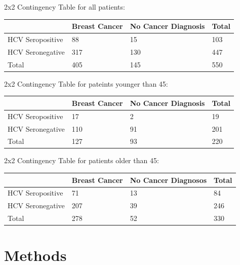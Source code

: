 \documentclass[12pt, titlepage]{article}
\begin{document}
\begin{minipage}{\textwidth}
2x2 Contingency Table for all patients:

\begin{tabular}{ | m{4cm} | m{4cm}| m{4cm} | m{2cm} | }
  \hline
    & Breast Cancer & No Cancer Diagnosis & Total\\ 
  \hline
  HCV Seropositive & 88 & 15 & 103 \\ 
  \hline
  HCV Seronegative & 317 & 130 & 447 \\ 
  \hline
  Total & 405 & 145 & 550 \\ 
  \hline
\end{tabular}

\vspace{1cm}

2x2 Contingency Table for pateints younger than 45:

\begin{tabular}{ | m{4cm} | m{4cm}| m{4cm} | m{2cm} | }
  \hline
    & Breast Cancer & No Cancer Diagnosis & Total\\ 
  \hline
  HCV Seropositive & 17 & 2 & 19 \\ 
  \hline
  HCV Seronegative & 110 & 91 & 201 \\ 
  \hline
  Total & 127 & 93 & 220 \\ 
  \hline
\end{tabular}

\vspace{1cm}

2x2 Contingency Table for patients older than 45:

\begin{tabular}{ | m{4cm} | m{4cm}| m{4cm} | m{2cm} | }
  \hline
    & Breast Cancer & No Cancer Diagnosos & Total\\ 
  \hline
  HCV Seropositive & 71 & 13 & 84 \\ 
  \hline
  HCV Seronegative & 207 & 39 & 246 \\ 
  \hline
  Total & 278 & 52 & 330 \\ 
  \hline
\end{tabular}

\vspace{1cm}

\end{minipage}


\section{Methods}
\label{sec:methods}
\end{document}
